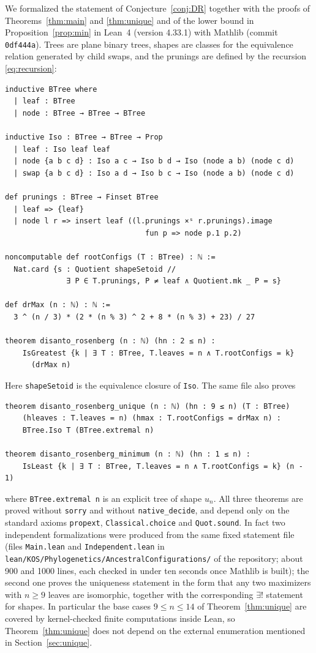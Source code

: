 \documentclass[11pt]{amsart}
\theoremstyle{definition}
\theoremstyle{remark}
\begin{document}
We formalized the statement of Conjecture~\ref{conj:DR} together with the proofs of Theorems~\ref{thm:main} and \ref{thm:unique} and of the lower bound in Proposition~\ref{prop:min} in Lean~4 (version 4.33.1) with Mathlib (commit \texttt{0df444a}).
Trees are plane binary trees, shapes are classes for the equivalence relation generated by child swaps, and the prunings are defined by the recursion \eqref{eq:recursion}:
\begin{Verbatim}[fontsize=\small,frame=single]
inductive BTree where
  | leaf : BTree
  | node : BTree → BTree → BTree

inductive Iso : BTree → BTree → Prop
  | leaf : Iso leaf leaf
  | node {a b c d} : Iso a c → Iso b d → Iso (node a b) (node c d)
  | swap {a b c d} : Iso a d → Iso b c → Iso (node a b) (node c d)

def prunings : BTree → Finset BTree
  | leaf => {leaf}
  | node l r => insert leaf ((l.prunings ×ˢ r.prunings).image
                                fun p => node p.1 p.2)

noncomputable def rootConfigs (T : BTree) : ℕ :=
  Nat.card {s : Quotient shapeSetoid //
              ∃ P ∈ T.prunings, P ≠ leaf ∧ Quotient.mk _ P = s}

def drMax (n : ℕ) : ℕ :=
  3 ^ (n / 3) * (2 * (n % 3) ^ 2 + 8 * (n % 3) + 23) / 27

theorem disanto_rosenberg (n : ℕ) (hn : 2 ≤ n) :
    IsGreatest {k | ∃ T : BTree, T.leaves = n ∧ T.rootConfigs = k}
      (drMax n)
\end{Verbatim}
Here \texttt{shapeSetoid} is the equivalence closure of \texttt{Iso}.
The same file also proves
\begin{Verbatim}[fontsize=\small,frame=single]
theorem disanto_rosenberg_unique (n : ℕ) (hn : 9 ≤ n) (T : BTree)
    (hleaves : T.leaves = n) (hmax : T.rootConfigs = drMax n) :
    BTree.Iso T (BTree.extremal n)

theorem disanto_rosenberg_minimum (n : ℕ) (hn : 1 ≤ n) :
    IsLeast {k | ∃ T : BTree, T.leaves = n ∧ T.rootConfigs = k} (n - 1)
\end{Verbatim}
where \texttt{BTree.extremal n} is an explicit tree of shape $u_n$.
All three theorems are proved without \texttt{sorry} and without \texttt{native\_decide}, and depend only on the standard axioms \texttt{propext}, \texttt{Classical.choice} and \texttt{Quot.sound}.
In fact two independent formalizations were produced from the same fixed statement file (files \texttt{Main.lean} and \texttt{Independent.lean} in \nolinkurl{lean/KOS/Phylogenetics/AncestralConfigurations/} of the repository; about 900 and 1000 lines, each checked in under ten seconds once Mathlib is built); the second one proves the uniqueness statement in the form that any two maximizers with $n\ge 9$ leaves are isomorphic, together with the corresponding $\exists!$ statement for shapes.
In particular the base cases $9\le n\le 14$ of Theorem~\ref{thm:unique} are covered by kernel-checked finite computations inside Lean, so Theorem~\ref{thm:unique} does not depend on the external enumeration mentioned in Section~\ref{sec:unique}.
\end{document}
